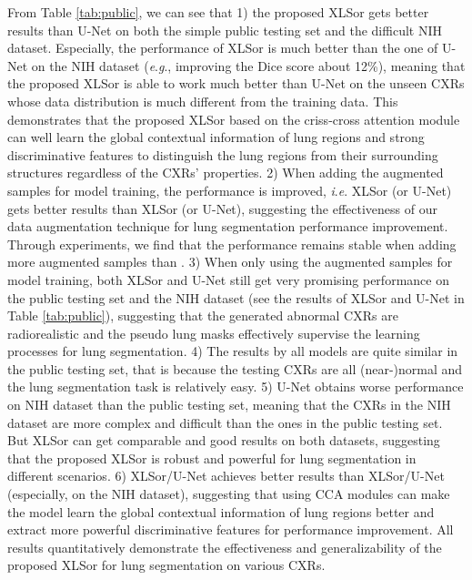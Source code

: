 \documentclass{midl} \usepackage{multirow}
\newcommand{\ie}{\textit{i}.\textit{e}. }
\newcommand{\eg}{\textit{e}.\textit{g}., }
\begin{document}
From Table \ref{tab:public}, we can see that 1) the proposed XLSor gets better results than U-Net on both the simple public testing set and the difficult NIH dataset. Especially, the performance of XLSor is much better than the one of U-Net on the NIH dataset (\eg improving the Dice score about 12\%), meaning that the proposed XLSor is able to work much better than U-Net on the unseen CXRs whose data distribution is much different from the training data. This demonstrates that the proposed XLSor based on the criss-cross attention module can well learn the global contextual information of lung regions and strong discriminative features to distinguish the lung regions from their surrounding structures regardless of the CXRs' properties. 2) When adding the augmented samples for model training, the performance is improved, \ie XLSor (or U-Net) gets better results than XLSor (or U-Net), suggesting the effectiveness of our data augmentation technique for lung segmentation performance improvement. Through experiments, we find that the performance remains stable when adding more augmented samples than . 3) When only using the augmented samples for model training, both XLSor and U-Net still get very promising performance on the public testing set and the NIH dataset (see the results of XLSor and U-Net in Table \ref{tab:public}), suggesting that the generated abnormal CXRs are radiorealistic and the pseudo lung masks effectively supervise the learning processes for lung segmentation. 4) The results by all models are quite similar in the public testing set, that is because the testing CXRs are all (near-)normal and the lung segmentation task is relatively easy. 5) U-Net obtains worse performance on NIH dataset than the public testing set, meaning that the CXRs in the NIH dataset are more complex and difficult than the ones in the public testing set. But XLSor can get comparable and good results on both datasets, suggesting that the proposed XLSor is robust and powerful for lung segmentation in different scenarios. 6) XLSor/U-Net achieves better results than XLSor/U-Net (especially, on the NIH dataset), suggesting that using CCA modules can make the model learn the global contextual information of lung regions better and extract more powerful discriminative features for performance improvement. All results quantitatively demonstrate the effectiveness and generalizability of the proposed XLSor for lung segmentation on various CXRs.
\end{document}
